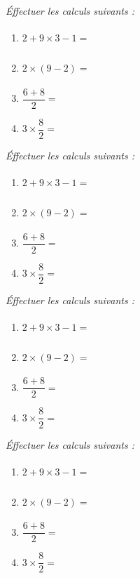 \documentclass[13pt]{article}
\begin{document}
\vspace{0.3cm}
\noindent\hrulefill
\vspace{0.3cm}

\begin{multicols}{2}

  \textit{Éffectuer les calculs suivants :}

  \begin{enumerate}
  \item $2 + 9 \times 3 - 1 = \phantom{\dfrac{1}{1}}$ 
  \item $2 \times (9 - 2) = \phantom{\dfrac{1}{1}} $
  \item $\dfrac{6 + 8}{2} = $
  \item $3 \times \dfrac{8}{2} = $
  \end{enumerate}

  \textit{Éffectuer les calculs suivants :}

  \begin{enumerate}
  \item $2 + 9 \times 3 - 1 = \phantom{\dfrac{1}{1}}$ 
  \item $2 \times (9 - 2) = \phantom{\dfrac{1}{1}}$
  \item $\dfrac{6 + 8}{2} = $
  \item $3 \times \dfrac{8}{2} = $
  \end{enumerate}

\end{multicols}

\vspace{0.3cm}
\noindent\hrulefill
\vspace{0.3cm}

\begin{multicols}{2}

  \textit{Éffectuer les calculs suivants :}

  \begin{enumerate}
  \item $2 + 9 \times 3 - 1 = \phantom{\dfrac{1}{1}}$ 
  \item $2 \times (9 - 2) = \phantom{\dfrac{1}{1}} $
  \item $\dfrac{6 + 8}{2} = $
  \item $3 \times \dfrac{8}{2} = $
  \end{enumerate}

  \textit{Éffectuer les calculs suivants :}

  \begin{enumerate}
  \item $2 + 9 \times 3 - 1 = \phantom{\dfrac{1}{1}}$ 
  \item $2 \times (9 - 2) = \phantom{\dfrac{1}{1}}$
  \item $\dfrac{6 + 8}{2} = $
  \item $3 \times \dfrac{8}{2} = $
  \end{enumerate}

\end{multicols}
\end{document}
